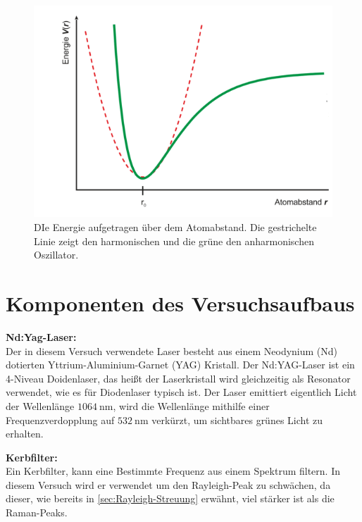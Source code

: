 \documentclass[.../bericht]{subfilies}
\begin{document}
    \begin{figure}[tb]
      \centering
      \includegraphics[scale=0.5]{figures/oszillator}
      \caption{DIe Energie aufgetragen über dem Atomabstand. Die gestrichelte Linie zeigt den harmonischen und die grüne den anharmonischen Oszillator. \cite{schwingungsspek}}
      \label{fig:oszillator}
    \end{figure}

  \section{Komponenten des Versuchsaufbaus}

    \textbf{Nd:Yag-Laser:}\\
    Der in diesem Versuch verwendete Laser besteht aus einem Neodynium (Nd) dotierten Yttrium-Aluminium-Garnet (YAG) Kristall. Der Nd:YAG-Laser ist ein 4-Niveau Doidenlaser, das heißt der Laserkristall wird  gleichzeitig als Resonator verwendet, wie es für Diodenlaser typisch ist. Der Laser emittiert eigentlich Licht der Wellenlänge $\SI{1064}{\nano\meter}$, wird die Wellenlänge mithilfe einer Frequenzverdopplung auf $\SI{532}{\nano\meter}$ verkürzt, um sichtbares grünes Licht zu erhalten.\\
    \cite{ndyag}
    \medskip

    \textbf{Kerbfilter:}\\
    Ein Kerbfilter, kann eine Bestimmte Frequenz aus einem Spektrum filtern. In diesem Versuch wird er verwendet um den Rayleigh-Peak zu schwächen, da dieser, wie bereits in \cref{sec:Rayleigh-Streuung} erwähnt, viel stärker ist als die Raman-Peaks.\\
    \cite{wiki:kerbfilter}
    \medskip
\end{document}
